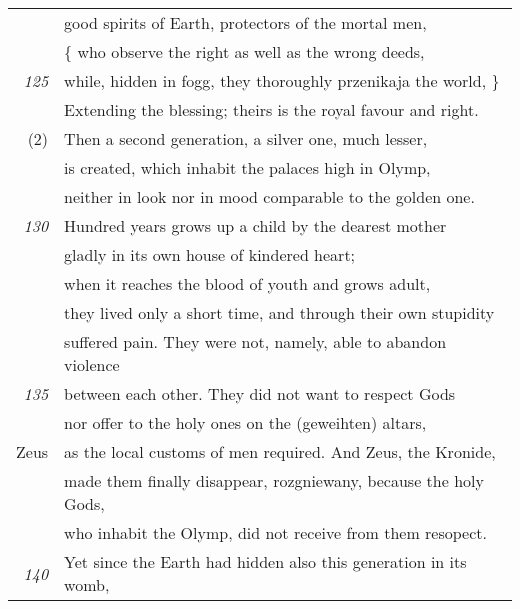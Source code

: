 \begin{tabular}[hb]{rl}
& good spirits of Earth, protectors of the mortal men, \\
& \{ who observe the right as well as the wrong deeds, \\
\footnotesize{\em 125}& while, hidden in fogg, they thoroughly przenikaja the world, \} \\
& Extending the blessing; theirs is the royal favour and right.\\
(2)& Then a second generation, a silver one, much lesser, \\
& is  created, which inhabit the palaces high in Olymp, \\
& neither in look nor in mood comparable to the golden one. \\
\footnotesize{\em 130}& Hundred years grows up a child by the dearest mother \\
& gladly in its own house of kindered heart; \\
& when it reaches the blood of youth and grows adult, \\
& they lived only a short time, and through their own stupidity \\
& suffered pain. They were not, namely, able to abandon violence \\
\footnotesize{\em 135}& between each other. They did not want to respect Gods\\
& nor offer to the holy ones on the (geweihten) altars, \\
Zeus & as the local customs of men required. And Zeus, the Kronide, \\
& made them finally disappear, rozgniewany, because the holy Gods, \\
& who inhabit the Olymp, did not receive from them  resopect.\\
\footnotesize{\em 140}& Yet since the Earth had hidden also this generation in its womb, \\

\end{tabular}
